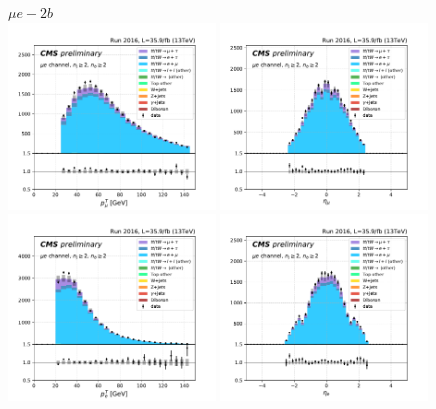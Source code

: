 \begin{figure}[ht]
    \centering
    $ \mu e- 2b$ \\
    \includegraphics[width=0.49\textwidth]{chapters/Appendix/sectionPlots/figures/kinematics_pickles/emu/2b/emu_2b_lepton1_pt.pdf}
    \includegraphics[width=0.49\textwidth]{chapters/Appendix/sectionPlots/figures/kinematics_pickles/emu/2b/emu_2b_lepton1_eta.pdf}
    \includegraphics[width=0.49\textwidth]{chapters/Appendix/sectionPlots/figures/kinematics_pickles/emu/2b/emu_2b_lepton2_pt.pdf}
    \includegraphics[width=0.49\textwidth]{chapters/Appendix/sectionPlots/figures/kinematics_pickles/emu/2b/emu_2b_lepton2_eta.pdf}

\end{figure}
